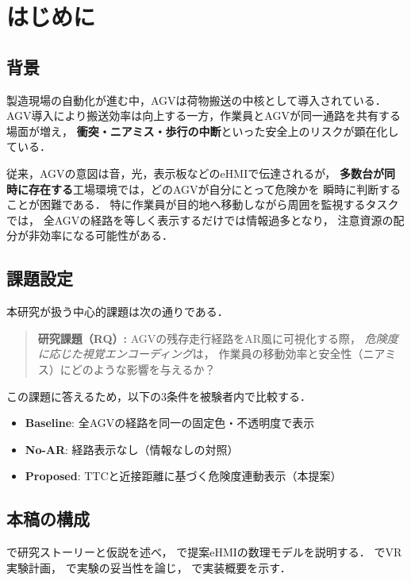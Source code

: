 \section{はじめに}
\label{sec:intro}

\subsection{背景}

製造現場の自動化が進む中，AGVは荷物搬送の中核として導入されている．
AGV導入により搬送効率は向上する一方，作業員とAGVが同一通路を共有する場面が増え，
\textbf{衝突・ニアミス・歩行の中断}といった安全上のリスクが顕在化している．

従来，AGVの意図は音，光，表示板などのeHMIで伝達されるが，
\textbf{多数台が同時に存在する}工場環境では，どのAGVが自分にとって危険かを
瞬時に判断することが困難である．
特に作業員が目的地へ移動しながら周囲を監視するタスクでは，
全AGVの経路を等しく表示するだけでは情報過多となり，
注意資源の配分が非効率になる可能性がある．

\subsection{課題設定}

本研究が扱う中心的課題は次の通りである．

\begin{quote}
  \textbf{研究課題（RQ）:}
  AGVの残存走行経路をAR風に可視化する際，
  \emph{危険度に応じた視覚エンコーディング}は，
  作業員の移動効率と安全性（ニアミス）にどのような影響を与えるか？
\end{quote}

この課題に答えるため，以下の3条件を被験者内で比較する．

\begin{itemize}[leftmargin=2em]
  \item \textbf{Baseline}: 全AGVの経路を同一の固定色・不透明度で表示
  \item \textbf{No-AR}: 経路表示なし（情報なしの対照）
  \item \textbf{Proposed}: TTCと近接距離に基づく危険度連動表示（本提案）
\end{itemize}

\subsection{本稿の構成}

で研究ストーリーと仮説を述べ，
で提案eHMIの数理モデルを説明する．
でVR実験計画，
で実験の妥当性を論じ，
で実装概要を示す．
